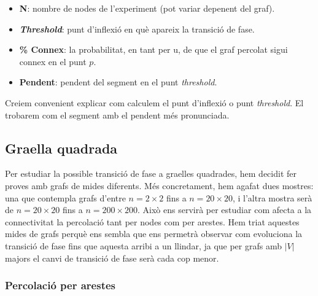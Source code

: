 \documentclass[a4paper]{article}
\begin{document}
	\begin{itemize}
		\item \textbf{N}: nombre de nodes de l'experiment (pot variar depenent del graf).
		\item \textbf{\textit{Threshold}}: punt d'inflexió en què apareix la transició de fase.
		\item \textbf{\% Connex}: la probabilitat, en tant per u, de que el graf percolat sigui connex en el punt $p$.
		\item \textbf{Pendent}: pendent del segment en el punt \textit{threshold}.
	\end{itemize}
	
	Creiem convenient explicar com calculem el punt d'inflexió o punt \textit{threshold}. El trobarem com el segment amb el pendent més pronunciada.
	
	\subsection{Graella quadrada}
	
	Per estudiar la possible transició de fase a graelles quadrades, hem decidit fer proves amb grafs de mides diferents. Més concretament, hem agafat dues mostres: una que contempla grafs d'entre $n = 2 \times 2$ fins a $n = 20 \times 20$, i l'altra mostra serà de $n = 20 \times 20$ fins a $n = 200 \times 200$. Això ens servirà per estudiar com afecta a la connectivitat la percolació tant per nodes com per arestes. Hem triat aquestes mides de grafs perquè ens sembla que ens permetrà observar com evoluciona la transició de fase fins que aquesta arribi a un llindar, ja que per grafs amb $|V|$ majors el canvi de transició de fase serà cada cop menor. \\
	
	\subsubsection{Percolació per arestes}
	
\end{document}
